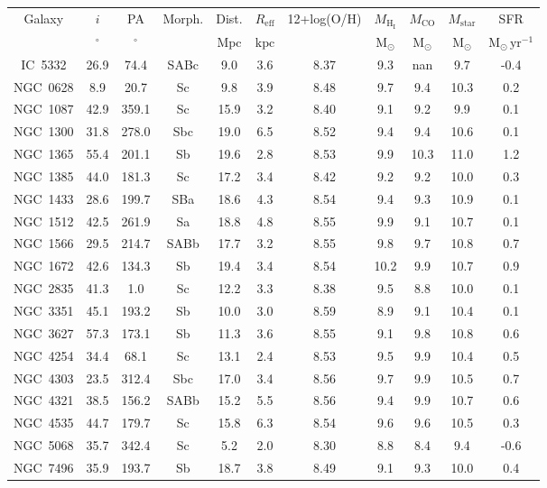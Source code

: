 \begin{table}
\begin{tabular}{ccccccccccc}
Galaxy & $i$ & PA & Morph. & Dist. & $R_\mathrm{eff}$ & 12+log(O/H) & $M_\mathrm{H_I}$ & $M_\mathrm{CO}$ & $M_\mathrm{star}$ & SFR \\
 & $\mathrm{{}^{\circ}}$ & $\mathrm{{}^{\circ}}$ &  & $\mathrm{Mpc}$ & $\mathrm{kpc}$ & $\mathrm{}$ & $\mathrm{M_{\odot}}$ & $\mathrm{M_{\odot}}$ & $\mathrm{M_{\odot}}$ & $\mathrm{M_{\odot}\,yr^{-1}}$ \\
IC~5332 & 26.9 & 74.4 & SABc & 9.0 & 3.6 & 8.37 & 9.3 & nan & 9.7 & -0.4 \\
NGC~0628 & 8.9 & 20.7 & Sc & 9.8 & 3.9 & 8.48 & 9.7 & 9.4 & 10.3 & 0.2 \\
NGC~1087 & 42.9 & 359.1 & Sc & 15.9 & 3.2 & 8.40 & 9.1 & 9.2 & 9.9 & 0.1 \\
NGC~1300 & 31.8 & 278.0 & Sbc & 19.0 & 6.5 & 8.52 & 9.4 & 9.4 & 10.6 & 0.1 \\
NGC~1365 & 55.4 & 201.1 & Sb & 19.6 & 2.8 & 8.53 & 9.9 & 10.3 & 11.0 & 1.2 \\
NGC~1385 & 44.0 & 181.3 & Sc & 17.2 & 3.4 & 8.42 & 9.2 & 9.2 & 10.0 & 0.3 \\
NGC~1433 & 28.6 & 199.7 & SBa & 18.6 & 4.3 & 8.54 & 9.4 & 9.3 & 10.9 & 0.1 \\
NGC~1512 & 42.5 & 261.9 & Sa & 18.8 & 4.8 & 8.55 & 9.9 & 9.1 & 10.7 & 0.1 \\
NGC~1566 & 29.5 & 214.7 & SABb & 17.7 & 3.2 & 8.55 & 9.8 & 9.7 & 10.8 & 0.7 \\
NGC~1672 & 42.6 & 134.3 & Sb & 19.4 & 3.4 & 8.54 & 10.2 & 9.9 & 10.7 & 0.9 \\
NGC~2835 & 41.3 & 1.0 & Sc & 12.2 & 3.3 & 8.38 & 9.5 & 8.8 & 10.0 & 0.1 \\
NGC~3351 & 45.1 & 193.2 & Sb & 10.0 & 3.0 & 8.59 & 8.9 & 9.1 & 10.4 & 0.1 \\
NGC~3627 & 57.3 & 173.1 & Sb & 11.3 & 3.6 & 8.55 & 9.1 & 9.8 & 10.8 & 0.6 \\
NGC~4254 & 34.4 & 68.1 & Sc & 13.1 & 2.4 & 8.53 & 9.5 & 9.9 & 10.4 & 0.5 \\
NGC~4303 & 23.5 & 312.4 & Sbc & 17.0 & 3.4 & 8.56 & 9.7 & 9.9 & 10.5 & 0.7 \\
NGC~4321 & 38.5 & 156.2 & SABb & 15.2 & 5.5 & 8.56 & 9.4 & 9.9 & 10.7 & 0.6 \\
NGC~4535 & 44.7 & 179.7 & Sc & 15.8 & 6.3 & 8.54 & 9.6 & 9.6 & 10.5 & 0.3 \\
NGC~5068 & 35.7 & 342.4 & Sc & 5.2 & 2.0 & 8.30 & 8.8 & 8.4 & 9.4 & -0.6 \\
NGC~7496 & 35.9 & 193.7 & Sb & 18.7 & 3.8 & 8.49 & 9.1 & 9.3 & 10.0 & 0.4 \\
\end{tabular}
\end{table}
